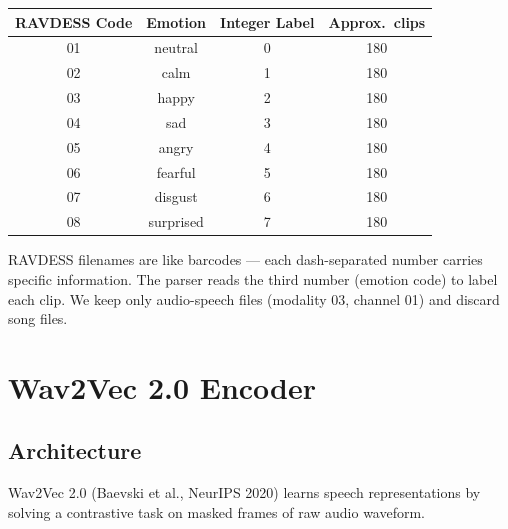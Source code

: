 \documentclass[12pt,a4paper]{article}
\theoremstyle{definition}
\theoremstyle{plain}
\theoremstyle{remark}
\begin{document}
\begin{center}
\renewcommand{\arraystretch}{1.1}
\begin{tabular}{@{}cccc@{}}
\toprule
\textbf{RAVDESS Code} & \textbf{Emotion} & \textbf{Integer Label} & \textbf{Approx.\ clips} \\
\midrule
01 & neutral   & 0 & 180 \\
02 & calm      & 1 & 180 \\
03 & happy     & 2 & 180 \\
04 & sad       & 3 & 180 \\
05 & angry     & 4 & 180 \\
06 & fearful   & 5 & 180 \\
07 & disgust   & 6 & 180 \\
08 & surprised & 7 & 180 \\
\bottomrule
\end{tabular}
\end{center}

\begin{tcolorbox}[layman]
RAVDESS filenames are like barcodes --- each dash-separated number carries specific
information.  The parser reads the third number (emotion code) to label each clip.
We keep only audio-speech files (modality 03, channel 01) and discard song files.
\end{tcolorbox}

\section{Wav2Vec 2.0 Encoder}

\subsection{Architecture}

Wav2Vec 2.0 (Baevski et al., NeurIPS 2020) learns speech representations by solving
a contrastive task on masked frames of raw audio waveform.
\end{document}
